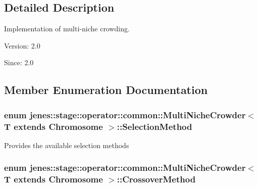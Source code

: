 \subsection{Detailed Description}
Implementation of multi-niche crowding.

\begin{Desc}
\item[Version:]2.0 \end{Desc}
\begin{Desc}
\item[Since:]2.0 \end{Desc}


\subsection{Member Enumeration Documentation}
\hypertarget{classjenes_1_1stage_1_1operator_1_1common_1_1_multi_niche_crowder_3_01_t_01extends_01_chromosome_01_4_1190dbbe875b99f6679f7b5deb68483b}{
\subsubsection[SelectionMethod]{\setlength{\rightskip}{0pt plus 5cm}enum jenes::stage::operator::common::MultiNicheCrowder$<$ T extends Chromosome $>$::{\bf SelectionMethod}}}
\label{classjenes_1_1stage_1_1operator_1_1common_1_1_multi_niche_crowder_3_01_t_01extends_01_chromosome_01_4_1190dbbe875b99f6679f7b5deb68483b}


Provides the available selection methods \hypertarget{classjenes_1_1stage_1_1operator_1_1common_1_1_multi_niche_crowder_3_01_t_01extends_01_chromosome_01_4_273881bd444aeae8ef77816000eac94c}{
\subsubsection[CrossoverMethod]{\setlength{\rightskip}{0pt plus 5cm}enum jenes::stage::operator::common::MultiNicheCrowder$<$ T extends Chromosome $>$::{\bf CrossoverMethod}}}
\label{classjenes_1_1stage_1_1operator_1_1common_1_1_multi_niche_crowder_3_01_t_01extends_01_chromosome_01_4_273881bd444aeae8ef77816000eac94c}


